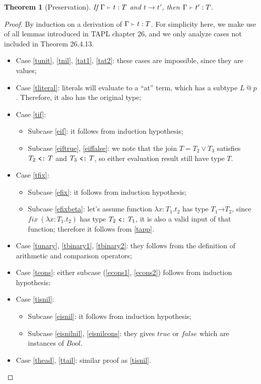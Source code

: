 \documentclass{report}
\makeatletter
\newtheorem{theorem}{Theorem}
\newtheorem{proof}{Proof}
\newcommand{\at}{~\texttt{@}~}
\newcommand{\arr}{\texttt{→}}
\newcommand{\ty}{{:}}
\newcommand{\subtype}{~\texttt{\raisebox{-.7pt}{<}:}~}
\newcommand{\type}{:}
\newcommand{\ctx}{~\mathsmaller\vdash~}
\newcommand{\ctxtype}[2]{\Gamma\ctx #1 \type #2}
\makeatother
\begin{document}
\begin{theorem}[Preservation]
  If $\ctxtype{t}{T}$ and $t\longrightarrow t'$, then $\ctxtype{t'}{T}$.
\end{theorem}
\begin{proof}
  By induction on a derivation of $\ctxtype{t}{T}$. For simplicity here, we make use of all lemmas introduced in TAPL chapter 26, and we only analyze cases not included in Theorem 26.4.13.
  \begin{itemize}
    \item Case \ref{tunit}, \ref{tnil}, \ref{tat1}, \ref{tat2}: these cases are impossible, since they are values;
    \item Case \ref{tliteral}: literals will evaluate to a ``at'' term, which has a subtype $L\at p$. Therefore, it also has the original type;
    \item Case \ref{tif}:
    \begin{itemize}
      \item Subcase \ref{eif}: it follows from induction hypothesis;
      \item Subcase \ref{eiftrue}, \ref{eiffalse}: we note that the join $T = T_2\vee T_3$ satisfies $T_2\subtype T$ and $T_3\subtype T$, so either evaluation result still have type $T$.
    \end{itemize}
    \item Case \ref{tfix}:
    \begin{itemize}
      \item Subcase \ref{efix}: it follows from induction hypothesis;
      \item Subcase \ref{efixbeta}: let's assume function $\lambda x\ty T_1.t_2$ has type $T_1\arr T_2$, since $fix~(\lambda x\ty T_1.t_2)$ has type $T_2\subtype T_1$, it is also a valid input of that function; therefore it follows from \ref{tapp}.
    \end{itemize}
    \item Case \ref{tunary}, \ref{tbinary1}, \ref{tbinary2}: they follows from the definition of arithmetic and comparison operators;
    \item Case \ref{tcons}: either subcase (\ref{econs1}, \ref{econs2}) follows from induction hypothesis;
    \item Case \ref{tisnil}:
    \begin{itemize}
      \item Subcase \ref{eisnil}: it follows from induction hypothesis;
      \item Subcase \ref{eisnilnil}, \ref{eisnilcons}: they gives $true$ or $false$ which are instances of $Bool$.
    \end{itemize}
    \item Case \ref{thead}, \ref{ttail}: similar proof as \ref{tisnil}.
  \end{itemize}
\end{proof}
\end{document}
